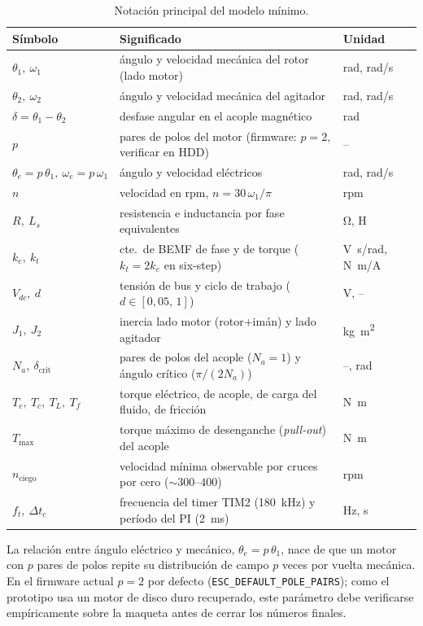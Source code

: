 \documentclass[11pt,a4paper,oneside]{report}
\theoremstyle{definition}
\theoremstyle{remark}
\begin{document}
\begin{table}[h]
\centering
\small
\begin{tabular}{@{}lll@{}}
\toprule
Símbolo & Significado & Unidad \\
\midrule
$\theta_1,\ \omega_1$ & ángulo y velocidad mecánica del rotor (lado motor) & \si{rad}, \si{rad/s} \\
$\theta_2,\ \omega_2$ & ángulo y velocidad mecánica del agitador & \si{rad}, \si{rad/s} \\
$\delta = \theta_1 - \theta_2$ & desfase angular en el acople magnético & \si{rad} \\
$p$ & pares de polos del motor (firmware: $p=2$, verificar en HDD) & -- \\
$\theta_e = p\,\theta_1,\ \omega_e = p\,\omega_1$ & ángulo y velocidad eléctricos & \si{rad}, \si{rad/s} \\
$n$ & velocidad en rpm, $n = 30\,\omega_1/\pi$ & \si{rpm} \\
$R,\ L_s$ & resistencia e inductancia por fase equivalentes & \si{\ohm}, \si{H} \\
$k_e,\ k_t$ & cte.\ de BEMF de fase y de torque ($k_t = 2k_e$ en six-step) & \si{V.s/rad}, \si{N.m/A} \\
$V_{dc},\ d$ & tensión de bus y ciclo de trabajo ($d\in[0{,}05,\,1]$) & \si{V}, -- \\
$J_1,\ J_2$ & inercia lado motor (rotor+imán) y lado agitador & \si{kg.m^2} \\
$N_a,\ \delta_{\text{crit}}$ & pares de polos del acople ($N_a=1$) y ángulo crítico ($\pi/(2N_a)$) & --, \si{rad} \\
$T_e,\ T_c,\ T_L,\ T_f$ & torque eléctrico, de acople, de carga del fluido, de fricción & \si{N.m} \\
$T_{\max}$ & torque máximo de desenganche (\emph{pull-out}) del acople & \si{N.m} \\
$n_{\text{ciego}}$ & velocidad mínima observable por cruces por cero ($\sim 300\text{--}400$) & \si{rpm} \\
$f_t,\ \Delta t_c$ & frecuencia del timer TIM2 (\SI{180}{kHz}) y período del PI (\SI{2}{ms}) & \si{Hz}, \si{s} \\
\bottomrule
\end{tabular}
\caption{Notación principal del modelo mínimo.}
\end{table}

La relación entre ángulo eléctrico y mecánico, $\theta_e = p\,\theta_1$, nace de
que un motor con $p$ pares de polos repite su distribución de campo $p$ veces
por vuelta mecánica. En el firmware actual $p=2$ por defecto
(\texttt{ESC\_DEFAULT\_POLE\_PAIRS}); como el prototipo usa un motor de disco
duro recuperado, este parámetro debe verificarse empíricamente sobre la maqueta
antes de cerrar los números finales.
\end{document}
